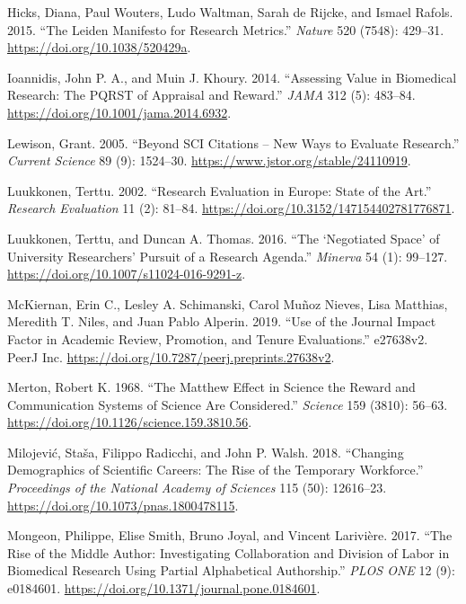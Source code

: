 \documentclass[]{elsarticle} %
\begin{document}
\leavevmode\hypertarget{ref-hicksLeidenManifestoResearch2015}{}%
Hicks, Diana, Paul Wouters, Ludo Waltman, Sarah de Rijcke, and Ismael
Rafols. 2015. ``The Leiden Manifesto for Research Metrics.''
\emph{Nature} 520 (7548): 429--31.
\url{https://doi.org/10.1038/520429a}.

\leavevmode\hypertarget{ref-ioannidisAssessingValueBiomedical2014}{}%
Ioannidis, John P. A., and Muin J. Khoury. 2014. ``Assessing Value in
Biomedical Research: The PQRST of Appraisal and Reward.'' \emph{JAMA}
312 (5): 483--84. \url{https://doi.org/10.1001/jama.2014.6932}.

\leavevmode\hypertarget{ref-lewisonSCICitationsNew2005}{}%
Lewison, Grant. 2005. ``Beyond SCI Citations -- New Ways to Evaluate
Research.'' \emph{Current Science} 89 (9): 1524--30.
\url{https://www.jstor.org/stable/24110919}.

\leavevmode\hypertarget{ref-luukkonenResearchEvaluationEurope2002}{}%
Luukkonen, Terttu. 2002. ``Research Evaluation in Europe: State of the
Art.'' \emph{Research Evaluation} 11 (2): 81--84.
\url{https://doi.org/10.3152/147154402781776871}.

\leavevmode\hypertarget{ref-luukkonenNegotiatedSpaceUniversity2016}{}%
Luukkonen, Terttu, and Duncan A. Thomas. 2016. ``The `Negotiated Space'
of University Researchers' Pursuit of a Research Agenda.''
\emph{Minerva} 54 (1): 99--127.
\url{https://doi.org/10.1007/s11024-016-9291-z}.

\leavevmode\hypertarget{ref-mckiernanUseJournalImpact2019}{}%
McKiernan, Erin C., Lesley A. Schimanski, Carol Muñoz Nieves, Lisa
Matthias, Meredith T. Niles, and Juan Pablo Alperin. 2019. ``Use of the
Journal Impact Factor in Academic Review, Promotion, and Tenure
Evaluations.'' e27638v2. PeerJ Inc.
\url{https://doi.org/10.7287/peerj.preprints.27638v2}.

\leavevmode\hypertarget{ref-mertonMatthewEffectScience1968}{}%
Merton, Robert K. 1968. ``The Matthew Effect in Science the Reward and
Communication Systems of Science Are Considered.'' \emph{Science} 159
(3810): 56--63. \url{https://doi.org/10.1126/science.159.3810.56}.

\leavevmode\hypertarget{ref-milojevicChangingDemographicsScientific2018}{}%
Milojević, Staša, Filippo Radicchi, and John P. Walsh. 2018. ``Changing
Demographics of Scientific Careers: The Rise of the Temporary
Workforce.'' \emph{Proceedings of the National Academy of Sciences} 115
(50): 12616--23. \url{https://doi.org/10.1073/pnas.1800478115}.

\leavevmode\hypertarget{ref-mongeonRiseMiddleAuthor2017}{}%
Mongeon, Philippe, Elise Smith, Bruno Joyal, and Vincent Larivière.
2017. ``The Rise of the Middle Author: Investigating Collaboration and
Division of Labor in Biomedical Research Using Partial Alphabetical
Authorship.'' \emph{PLOS ONE} 12 (9): e0184601.
\url{https://doi.org/10.1371/journal.pone.0184601}.
\end{document}
